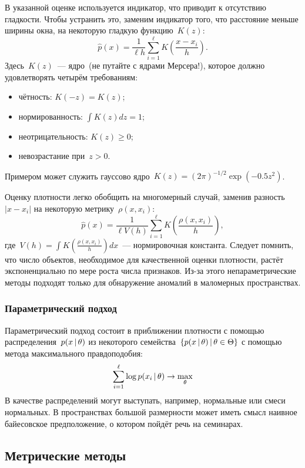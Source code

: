 \documentclass[12pt,fleqn]{article}
\begin{document}
В указанной оценке используется индикатор, что приводит к отсутствию гладкости.
Чтобы устранить это, заменим индикатор того, что расстояние меньше ширины окна,
на некоторую гладкую функцию~$K(z)$:
\[
    \hat p(x)
    =
    \frac{1}{\ell h}
    \sum_{i = 1}^{\ell}
        K
        \left(
            \frac{x - x_i}{h}
        \right).
\]
Здесь~$K(z)$~--- ядро~(не путайте с ядрами Мерсера!), которое должно удовлетворять
четырём требованиям:
\begin{itemize}
    \item чётность: $K(-z) = K(z)$;
    \item нормированность: $\int K(z) dz = 1$;
    \item неотрицательность: $K(z) \geq 0$;
    \item невозрастание при~$z > 0$.
\end{itemize}
Примером может служить гауссово ядро~$K(z) = (2 \pi)^{-1/2} \exp(-0.5 z^2)$.

Оценку плотности легко обобщить на многомерный случай, заменив разность~$|x - x_i|$
на некоторую метрику~$\rho(x, x_i)$:
\begin{equation}
\label{eq:nonparametric}
    \hat p(x)
    =
    \frac{1}{\ell V(h)}
    \sum_{i = 1}^{\ell}
        K
        \left(
            \frac{\rho(x, x_i)}{h}
        \right),
\end{equation}
где~$V(h) = \int K \left( \frac{\rho(x, x_i)}{h} \right) dx$~--- нормировочная константа.
Следует помнить, что число объектов, необходимое для качественной оценки плотности,
растёт экспоненциально по мере роста числа признаков.
Из-за этого непараметрические методы подходят только для обнаружение аномалий
в маломерных пространствах.

\subsubsection{Параметрический подход}

Параметрический подход состоит в приближении плотности с помощью распределения~$p(x \mspace{3mu}{|}\mspace{3mu} \theta)$
из некоторого семейства~$\{p(x \mspace{3mu}{|}\mspace{3mu} \theta) \mspace{3mu}{|}\mspace{3mu} \theta \in \Theta\}$
с помощью метода максимального правдоподобия:
\[
    \sum_{i = 1}^{\ell}
        \log p(x_i \mspace{3mu}{|}\mspace{3mu} \theta)
    \to
    \max_\theta
\]
В качестве распределений могут выступать, например, нормальные или смеси нормальных.
В пространствах большой размерности может иметь смысл наивное байесовское предположение,
о котором пойдёт речь на семинарах.

\subsection{Метрические методы}
\end{document}
